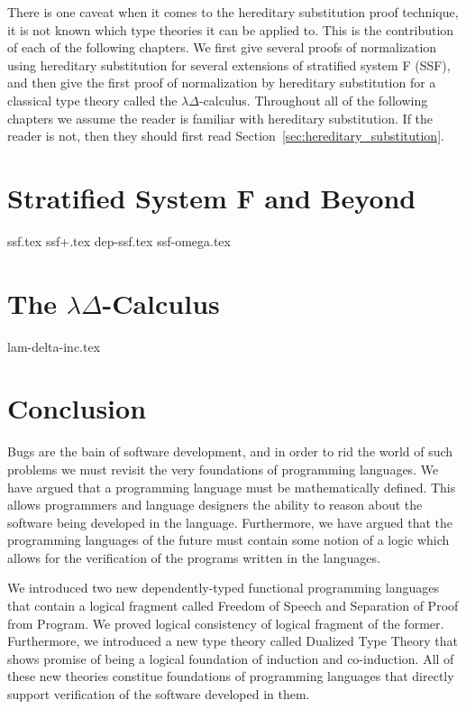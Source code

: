 \documentclass[phd,appendix,dedicationpage,ackpage,epigraphpage]{uithesis}
\begin{document}
There is one caveat when it comes to the hereditary substitution proof
technique, it is not known which type theories it can be applied to.
This is the contribution of each of the following chapters.  We first
give several proofs of normalization using hereditary substitution for
several extensions of stratified system F (SSF), and then give the
first proof of normalization by hereditary substitution for a
classical type theory called the $\lambda\Delta$-calculus.  Throughout
all of the following chapters we assume the reader is familiar with
hereditary substitution.  If the reader is not, then they should first
read Section~\ref{sec:hereditary_substitution}.

\chapter{Stratified System F and Beyond}
\label{chap:stratified_system_f_and_beyond}
{ssf.tex}
{ssf+.tex}
{dep-ssf.tex}
{ssf-omega.tex}

\chapter{The $\lambda\Delta$-Calculus}
\label{chap:the_lambdadelta-calculus}
{lam-delta-inc.tex}


\chapter{Conclusion}
\label{chap:conclusion}

Bugs are the bain of software development, and in order to rid the
world of such problems we must revisit the very foundations of
programming languages.  We have argued that a programming language
must be mathematically defined.  This allows programmers and language
designers the ability to reason about the software being developed in
the language.  Furthermore, we have argued that the programming
languages of the future must contain some notion of a logic which
allows for the verification of the programs written in the languages.

We introduced two new dependently-typed functional programming
languages that contain a logical fragment called Freedom of Speech and
Separation of Proof from Program.  We proved logical consistency of
logical fragment of the former.  Furthermore, we introduced a new type
theory called Dualized Type Theory that shows promise of being a
logical foundation of induction and co-induction.  All of these new
theories constitue foundations of programming languages that directly
support verification of the software developed in them.
\end{document}
